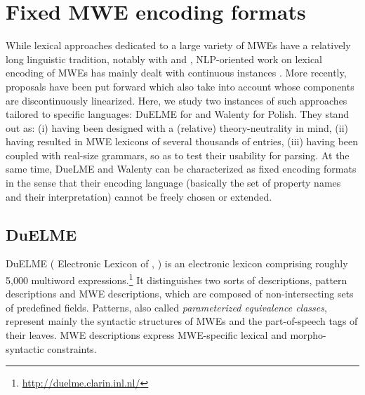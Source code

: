 \documentclass[output=paper
,modfonts
,nonflat
,biblatexbackend=biber
]{langsci/langscibook}
\begin{document}
%
\section{Fixed MWE encoding formats}
\label{lic:sec:fixed}


While lexical approaches dedicated to a large variety of MWEs have a relatively long linguistic tradition, notably with \cite{gross:86} and \cite{melcuketal:88}, NLP-oriented work on lexical encoding of MWEs has mainly dealt with continuous instances \citep{savary:08}. More recently, proposals have been put forward which also take  into account whose components are discontinuously linearized. Here, we study two instances of such approaches tailored to specific languages: DuELME \citep{gregoire:10} for  and Walenty \citep{prz:etal:14b} for Polish. They stand out as: (i) having been designed with a (relative) theory-neutrality in mind, (ii) having resulted in MWE lexicons of several thousands of entries, (iii) having been coupled with real-size grammars, so as to test their usability for parsing. At the same time, DueLME and Walenty can be characterized as fixed encoding formats in the sense that their encoding language (basically the set of property names and their interpretation) cannot be freely chosen or extended.

\subsection{DuELME}
\label{lic:sec:duelme}

DuELME ( Electronic Lexicon of , \citealt{gregoire:10}) is an electronic lexicon comprising roughly 5,000  multiword expressions.\footnote{\url{http://duelme.clarin.inl.nl/}} It distinguishes two sorts of descriptions, pattern descriptions and MWE descriptions, which are composed of non-intersecting sets of predefined fields. Patterns, also called \textit{parameterized equivalence classes}, represent mainly the syntactic structures of MWEs and the part-of-speech tags of their leaves. MWE descriptions express MWE-specific lexical and morpho-syntactic constraints.
\end{document}
